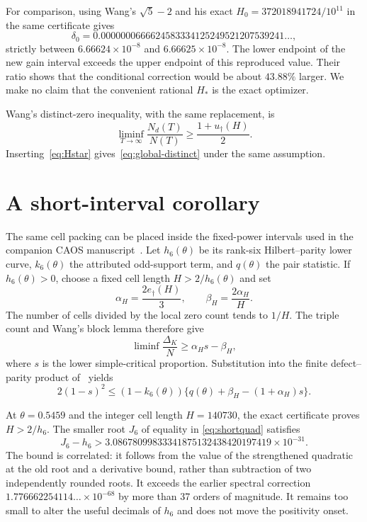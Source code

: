 \documentclass[11pt]{article}
\theoremstyle{remark}
\newcommand{\edag}{e_{\dagger}}
\newcommand{\udag}{u_{\dagger}}
\begin{document}
For comparison, using Wang's $\sqrt5-2$ and his exact
$H_0=372018941724/10^{11}$ in the same certificate gives
\[
 \delta_0=
 0.0000000666624583334125249521207539241\ldots,
\]
strictly between $6.66624\times10^{-8}$ and
$6.66625\times10^{-8}$.  The lower endpoint of the new gain interval exceeds
the upper endpoint of this reproduced value.  Their ratio shows that the
conditional correction would be about $43.88\%$ larger.  We make no claim that the convenient
rational $H_*$ is the exact optimizer.

Wang's distinct-zero inequality, with the same replacement, is
\[
 \liminf_{T\to\infty}\frac{N_d(T)}{N(T)}
 \ge\frac{1+\udag(H)}2.
\]
Inserting~\eqref{eq:Hstar} gives~\eqref{eq:global-distinct} under the same assumption.

\section{A short-interval corollary}\label{sec:short}

The same cell packing can be placed inside the fixed-power intervals used in
the companion CAOS manuscript~\cite{CAOSShort}.  Let $h_6(\theta)$ be its
rank-six Hilbert--parity lower curve, $k_6(\theta)$ the attributed odd-support
term, and $q(\theta)$ the pair statistic.  If $h_6(\theta)>0$, choose a fixed
cell length $H>2/h_6(\theta)$ and set
\[
 \alpha_H=\frac{2\edag(H)}3,
 \qquad
 \beta_H=\frac{2\alpha_H}{H}.
\]
The number of cells divided by the local zero count tends to $1/H$.  The
triple count and Wang's block lemma therefore give
\[
 \liminf\frac{\Delta_K}{N}\ge\alpha_Hs-\beta_H,
\]
where $s$ is the lower simple-critical proportion.  Substitution into the
finite defect--parity product of~\cite{CAOSShort} yields
\begin{equation}\label{eq:shortquad}
 2(1-s)^2\le(1-k_6(\theta))
 \{q(\theta)+\beta_H-(1+\alpha_H)s\}.
\end{equation}

At $\theta=0.5459$ and the integer cell length $H=140730$, the exact
certificate proves $H>2/h_6$.  The smaller root $J_6$ of equality in
\eqref{eq:shortquad} satisfies
\begin{equation}\label{eq:shortgain}
 J_6-h_6>
 3.08678099833341875132438420197419\times10^{-31}.
\end{equation}
The bound is correlated: it follows from the value of the strengthened
quadratic at the old root and a derivative bound, rather than subtraction of
two independently rounded roots.  It exceeds the earlier spectral correction
$1.776662254114\ldots\times10^{-68}$ by more than 37 orders of magnitude.
It remains too small to alter the useful decimals of $h_6$ and does not move
the positivity onset.
\end{document}
